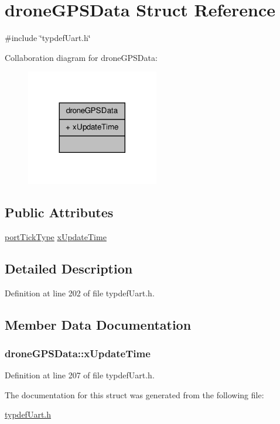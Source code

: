 \hypertarget{structdroneGPSData}{\section{drone\-G\-P\-S\-Data Struct Reference}
\label{structdroneGPSData}
}


{\ttfamily \#include \char`\"{}typdef\-Uart.\-h\char`\"{}}



Collaboration diagram for drone\-G\-P\-S\-Data\-:\nopagebreak
\begin{figure}[H]
\begin{center}
\leavevmode
\includegraphics[width=164pt]{structdroneGPSData__coll__graph}
\end{center}
\end{figure}
\subsection*{Public Attributes}
\begin{DoxyCompactItemize}
\item 
\hyperlink{typdefUart_8h_ae9fa5e001303f1be1c0294f26cde8caf}{port\-Tick\-Type} \hyperlink{structdroneGPSData_a70d6916fb0e0d02ee97ee4208cafbbed}{x\-Update\-Time}
\end{DoxyCompactItemize}


\subsection{Detailed Description}


Definition at line 202 of file typdef\-Uart.\-h.



\subsection{Member Data Documentation}
\hypertarget{structdroneGPSData_a70d6916fb0e0d02ee97ee4208cafbbed}{
\subsubsection[{x\-Update\-Time}]{ drone\-G\-P\-S\-Data\-::x\-Update\-Time}}\label{structdroneGPSData_a70d6916fb0e0d02ee97ee4208cafbbed}


Definition at line 207 of file typdef\-Uart.\-h.



The documentation for this struct was generated from the following file\-:\begin{DoxyCompactItemize}
\item 
\hyperlink{typdefUart_8h}{typdef\-Uart.\-h}\end{DoxyCompactItemize}
